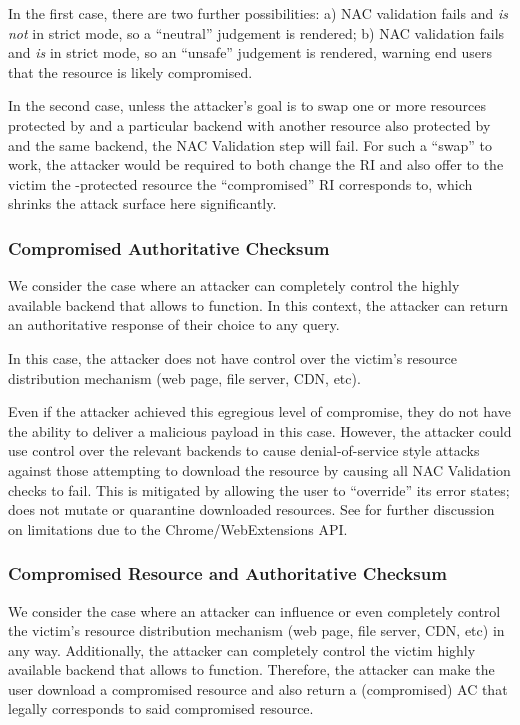 In the first case, there are two further possibilities: a) NAC validation fails
and \SYSTEM{} \emph{is not} in strict mode, so a ``neutral'' judgement is
rendered; b) NAC validation fails and \SYSTEM{} \emph{is} in strict mode, so an
``unsafe'' judgement is rendered, warning end users that the resource is likely
compromised.

In the second case, unless the attacker's goal is to swap one or more resources
protected by \SYSTEM{} and a particular backend with another resource also
protected by \SYSTEM{} and the same backend, the NAC Validation step will fail.
For such a ``swap'' to work, the attacker would be required to both change the
RI and also offer to the victim the \SYSTEM{}-protected resource the
``compromised'' RI corresponds to, which shrinks the attack surface here
significantly.

\subsubsection{Compromised Authoritative Checksum}

We consider the case where an attacker can completely control the highly
available backend that allows \SYSTEM{} to function. In this context, the
attacker can return an authoritative response of their choice to any query.

In this case, the attacker does not have control over the victim's resource
distribution mechanism (web page, file server, CDN, etc).

Even if the attacker achieved this egregious level of compromise, they do not
have the ability to deliver a malicious payload in this case. However, the
attacker could use control over the relevant backends to cause denial-of-service
style attacks against those attempting to download the resource by causing all
NAC Validation checks to fail. This is mitigated by \SYSTEM{} allowing the user
to ``override'' its error states; \ie \SYSTEM{} does not mutate or quarantine
downloaded resources. See  for further discussion on
limitations due to the Chrome/WebExtensions API.

\subsubsection{Compromised Resource and Authoritative Checksum}

We consider the case where an attacker can influence or even completely control
the victim's resource distribution mechanism (web page, file server, CDN, etc)
in any way. Additionally, the attacker can completely control the victim highly
available backend that allows \SYSTEM{} to function. Therefore, the attacker can
make the user download a compromised resource and also return a (compromised) AC
that legally corresponds to said compromised resource.

